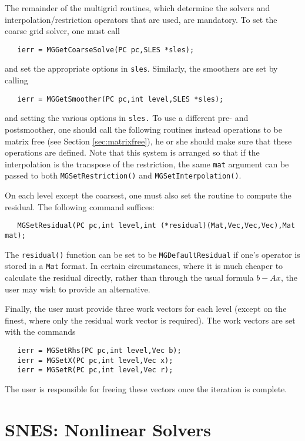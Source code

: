 The remainder of the multigrid routines, which determine
the solvers and interpolation/restriction operators that are used,
are mandatory.
To set the coarse grid solver, one must 
call 
\begin{verbatim}
   ierr = MGGetCoarseSolve(PC pc,SLES *sles);
\end{verbatim}
and set the appropriate options in {\tt sles}. Similarly, the 
smoothers are set by calling 
\begin{verbatim}
   ierr = MGGetSmoother(PC pc,int level,SLES *sles);
\end{verbatim}
and setting the various options in {\tt sles.} 
To use a different pre- and postsmoother, one should call the following
routines instead operations to be matrix free
(see Section \ref{sec:matrixfree}),
he or she should make sure that these operations are defined. 
Note that this system is arranged so that if the interpolation is 
the transpose of the restriction, the same {\tt mat} argument can be 
passed to both {\tt MGSetRestriction()} and {\tt MGSetInterpolation()}.

On each level except the coarsest, one must also set the routine to 
compute the residual.  The following command suffices: 
\begin{verbatim}
   MGSetResidual(PC pc,int level,int (*residual)(Mat,Vec,Vec,Vec),Mat mat);
\end{verbatim}
The {\tt residual()} function can be set to be {\tt MGDefaultResidual}
if 
one's operator is stored in a {\tt Mat} format.  In certain circumstances, 
where it is much cheaper to calculate the residual directly, rather 
than through the usual formula $b - Ax$,  the user may wish to provide 
an alternative. 

Finally, the user must provide three work vectors for each level 
(except on the finest, where only the residual work vector is required).
The work vectors are set with the 
commands    
\begin{verbatim}
   ierr = MGSetRhs(PC pc,int level,Vec b);
   ierr = MGSetX(PC pc,int level,Vec x);
   ierr = MGSetR(PC pc,int level,Vec r);
\end{verbatim}
The user is responsible for freeing these vectors once the iteration 
is complete.

\chapter{SNES: Nonlinear Solvers}
\label{chapter:snes}


